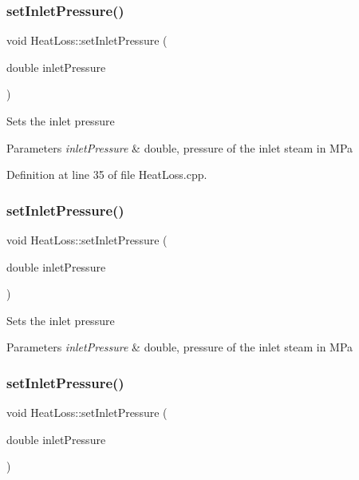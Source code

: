 \subsubsection{\texorpdfstring{set\+Inlet\+Pressure()}{setInletPressure()}\hspace{0.1cm}{\footnotesize\ttfamily [1/3]}}
{\footnotesize\ttfamily void Heat\+Loss\+::set\+Inlet\+Pressure (\begin{DoxyParamCaption}\item[{double}]{inlet\+Pressure }\end{DoxyParamCaption})}

Sets the inlet pressure 
\begin{DoxyParams}{Parameters}
{\em inlet\+Pressure} & double, pressure of the inlet steam in M\+Pa \\
\hline
\end{DoxyParams}


Definition at line 35 of file Heat\+Loss.\+cpp.

\mbox{\label{class_heat_loss_ab0a6b1f2a964d161d25758318f25f7e3}} 
\subsubsection{\texorpdfstring{set\+Inlet\+Pressure()}{setInletPressure()}\hspace{0.1cm}{\footnotesize\ttfamily [2/3]}}
{\footnotesize\ttfamily void Heat\+Loss\+::set\+Inlet\+Pressure (\begin{DoxyParamCaption}\item[{double}]{inlet\+Pressure }\end{DoxyParamCaption})}

Sets the inlet pressure 
\begin{DoxyParams}{Parameters}
{\em inlet\+Pressure} & double, pressure of the inlet steam in M\+Pa \\
\hline
\end{DoxyParams}
\mbox{\label{class_heat_loss_ab0a6b1f2a964d161d25758318f25f7e3}} 
\subsubsection{\texorpdfstring{set\+Inlet\+Pressure()}{setInletPressure()}\hspace{0.1cm}{\footnotesize\ttfamily [3/3]}}
{\footnotesize\ttfamily void Heat\+Loss\+::set\+Inlet\+Pressure (\begin{DoxyParamCaption}\item[{double}]{inlet\+Pressure }\end{DoxyParamCaption})}

